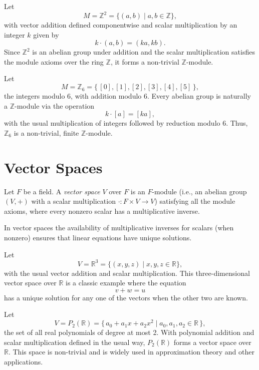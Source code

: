 \documentclass[11pt,openany]{article}
\begin{document}
\begin{example}
	Let
	\[
	M=\mathbb{Z}^2 = \{ (a,b) \mid a,b\in \mathbb{Z} \},
	\]
	with vector addition defined componentwise and scalar multiplication by an integer \(k\) given by
	\[
	k\cdot (a,b) = (ka, kb).
	\]
	Since \(\mathbb{Z}^2\) is an abelian group under addition and the scalar multiplication satisfies the module axioms over the ring \(\mathbb{Z}\), it forms a non-trivial \(\mathbb{Z}\)-module.
\end{example}

\begin{example}
	Let
	\[
	M=\mathbb{Z}_6 = \{\, [0], [1], [2], [3], [4], [5] \,\},
	\]
	the integers modulo 6, with addition modulo 6. Every abelian group is naturally a \(\mathbb{Z}\)-module via the operation
	\[
	k\cdot [a] = [ka],
	\]
	with the usual multiplication of integers followed by reduction modulo 6. Thus, \(\mathbb{Z}_6\) is a non-trivial, finite \(\mathbb{Z}\)-module.
\end{example}

\section{Vector Spaces}
\begin{definition}
	Let \(F\) be a field. A \emph{vector space} \(V\) over \(F\) is an \(F\)-module (i.e., an abelian group \((V, +)\) with a scalar multiplication \(\cdot: F\times V \to V\)) satisfying all the module axioms, where every nonzero scalar has a multiplicative inverse.
\end{definition}

In vector spaces the availability of multiplicative inverses for scalars (when nonzero) ensures that linear equations have unique solutions.

\begin{example}[\(\mathbb{R}^3\)]
	Let
	\[
	V = \mathbb{R}^3 = \{ (x,y,z) \mid x,y,z\in\mathbb{R} \},
	\]
	with the usual vector addition and scalar multiplication. This three-dimensional vector space over \(\mathbb{R}\) is a classic example where the equation
	\[
	v + w = u
	\]
	has a unique solution for any one of the vectors when the other two are known.
\end{example}

\begin{example}
	Let
	\[
	V = P_2(\mathbb{R}) = \{\, a_0 + a_1 x + a_2 x^2 \mid a_0,a_1,a_2 \in \mathbb{R} \,\},
	\]
	the set of all real polynomials of degree at most 2. With polynomial addition and scalar multiplication defined in the usual way, \(P_2(\mathbb{R})\) forms a vector space over \(\mathbb{R}\). This space is non-trivial and is widely used in approximation theory and other applications.
\end{example}
\end{document}
